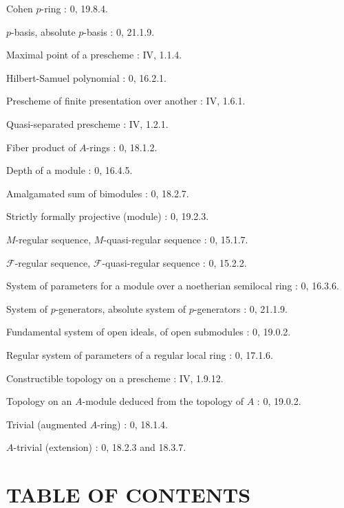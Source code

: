 Cohen $p$-ring : 0, 19.8.4.\par
$p$-basis, absolute $p$-basis : 0, 21.1.9.\par
Maximal point of a prescheme : IV, 1.1.4.\par

\clearpage
{}
Hilbert-Samuel polynomial : 0, 16.2.1.\par
Prescheme of finite presentation over another : IV, 1.6.1.\par
Quasi-separated prescheme : IV, 1.2.1.\par
Fiber product of $A$-rings : 0, 18.1.2.\par
Depth of a module : 0, 16.4.5.\par

Amalgamated sum of bimodules : 0, 18.2.7.\par
Strictly formally projective (module) : 0, 19.2.3.\par
$M$-regular sequence, $M$-quasi-regular sequence : 0, 15.1.7.\par
$\mathscr F$-regular sequence, $\mathscr F$-quasi-regular sequence : 0, 15.2.2.\par
System of parameters for a module over a noetherian semilocal ring : 0, 16.3.6.\par
System of $p$-generators, absolute system of $p$-generators : 0, 21.1.9.\par
Fundamental system of open ideals, of open submodules : 0, 19.0.2.\par
Regular system of parameters of a regular local ring : 0, 17.1.6.\par

Constructible topology on a prescheme : IV, 1.9.12.\par
Topology on an $A$-module deduced from the topology of $A$ : 0, 19.0.2.\par
Trivial (augmented $A$-ring) : 0, 18.1.4.\par
$A$-trivial (extension) : 0, 18.2.3 and 18.3.7.\par

\clearpage
{}
{}
\section*{TABLE OF CONTENTS}

